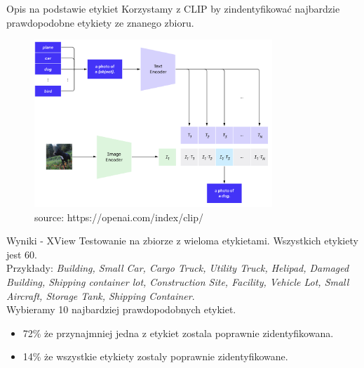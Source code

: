 \documentclass{beamer}
\begin{document}
\begin{frame}{Opis na podstawie etykiet}
  Korzystamy z CLIP by zindentyfikować najbardzie prawdopodobne etykiety ze znanego zbioru.
  \begin{figure}
    \centering
    \includegraphics[width=0.8\textwidth]{../img/clip-zero-shot-from-label.png}
    \caption*{\tiny source: https://openai.com/index/clip/}
  \end{figure}
\end{frame}

\begin{frame}{Wyniki - XView}
  Testowanie na zbiorze z wieloma etykietami. Wszystkich etykiety jest 60. \\[1em]
  Przykłady: \textit{Building, Small Car, Cargo Truck, Utility Truck, Helipad, Damaged Building, Shipping container lot, Construction Site, Facility, Vehicle Lot, Small Aircraft, Storage Tank, Shipping Container}. \\[1em]
  Wybieramy 10 najbardziej prawdopodobnych etykiet.\\[1em]
  \begin{itemize}
    \item 72\% że przynajmniej jedna z etykiet zostala poprawnie zidentyfikowana.
    \item 14\% że wszystkie etykiety zostaly poprawnie zidentyfikowane.
  \end{itemize}
\end{frame}
\end{document}
